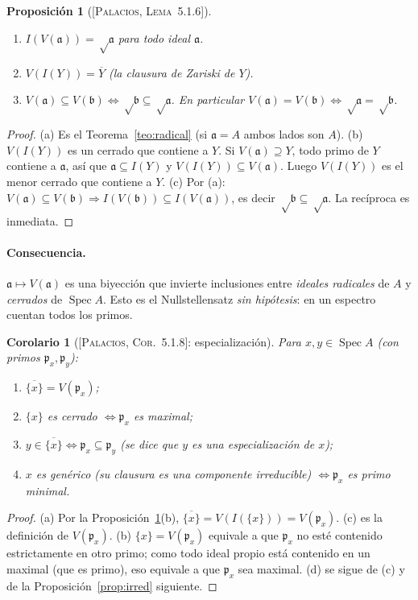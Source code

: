\documentclass[11pt,a4paper]{article}
\newcommand{\Spec}{\operatorname{Spec}}
\newcommand{\pp}{\mathfrak{p}}
\newcommand{\aaa}{\mathfrak{a}}
\newcommand{\bbb}{\mathfrak{b}}
\theoremstyle{plain}
\newtheorem{proposicion}[teorema]{Proposición}
\newtheorem{corolario}[teorema]{Corolario}
\theoremstyle{definition}
\theoremstyle{remark}
\newcommand{\libro}[1]{\textsc{[Palacios, #1]}}
\begin{document}
\begin{proposicion}[{\libro{Lema~5.1.6}}]\label{prop:dicc}
\begin{enumerate}[label=(\alph*),itemsep=1pt]
\item $I(V(\aaa))=\sqrt\aaa$ para todo ideal $\aaa$.
\item $V(I(Y))=\overline Y$ (la clausura de Zariski de $Y$).
\item $V(\aaa)\subseteq V(\bbb)\iff\sqrt\bbb\subseteq\sqrt\aaa$. En particular $V(\aaa)=V(\bbb)\iff\sqrt\aaa=\sqrt\bbb$.
\end{enumerate}
\end{proposicion}
\begin{proof}
(a) Es el Teorema~\ref{teo:radical} (si $\aaa=A$ ambos lados son $A$). (b) $V(I(Y))$ es un cerrado que contiene a $Y$. Si $V(\aaa)\supseteq Y$, todo primo de $Y$ contiene a $\aaa$, así que $\aaa\subseteq I(Y)$ y $V(I(Y))\subseteq V(\aaa)$. Luego $V(I(Y))$ es el menor cerrado que contiene a $Y$. (c) Por (a): $V(\aaa)\subseteq V(\bbb)\Rightarrow I(V(\bbb))\subseteq I(V(\aaa))$, es decir $\sqrt\bbb\subseteq\sqrt\aaa$. La recíproca es inmediata.
\end{proof}

\paragraph{Consecuencia.} $\aaa\mapsto V(\aaa)$ es una biyección que invierte inclusiones entre \emph{ideales radicales} de $A$ y \emph{cerrados} de $\Spec A$. Esto es el Nullstellensatz \emph{sin hipótesis}: en un espectro cuentan todos los primos.

\begin{corolario}[{\libro{Cor.~5.1.8}: especialización}]\label{cor:espec}
Para $x,y\in\Spec A$ (con primos $\pp_x,\pp_y$):
\begin{enumerate}[label=(\alph*),itemsep=1pt]
\item $\overline{\{x\}}=V(\pp_x)$;
\item $\{x\}$ es cerrado $\iff\pp_x$ es maximal;
\item $y\in\overline{\{x\}}\iff\pp_x\subseteq\pp_y$ (se dice que $y$ es una \emph{especialización} de $x$);
\item $x$ es \emph{genérico} (su clausura es una componente irreducible) $\iff\pp_x$ es primo minimal.
\end{enumerate}
\end{corolario}
\begin{proof}
(a) Por la Proposición~\ref{prop:dicc}(b), $\overline{\{x\}}=V(I(\{x\}))=V(\pp_x)$. (c) es la definición de $V(\pp_x)$. (b) $\{x\}=V(\pp_x)$ equivale a que $\pp_x$ no esté contenido estrictamente en otro primo; como todo ideal propio está contenido en un maximal (que es primo), eso equivale a que $\pp_x$ sea maximal. (d) se sigue de (c) y de la Proposición~\ref{prop:irred} siguiente.
\end{proof}
\end{document}
